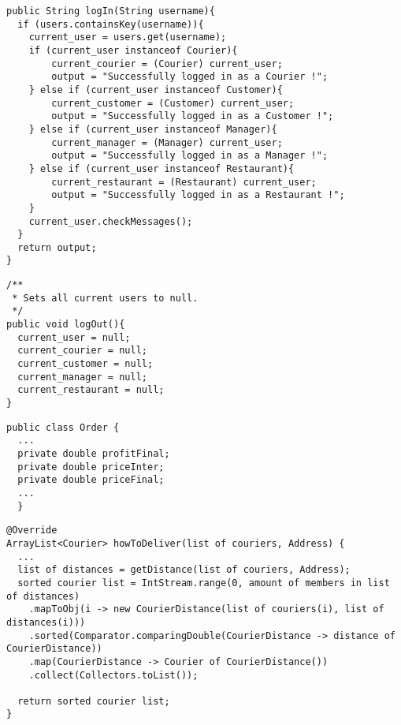 \begin{lstlisting}[caption=the main methods for the log in log out system.,
  label=lst:login]
public String logIn(String username){
  if (users.containsKey(username)){
    current_user = users.get(username);
    if (current_user instanceof Courier){
    	current_courier = (Courier) current_user;
    	output = "Successfully logged in as a Courier !";
    } else if (current_user instanceof Customer){
    	current_customer = (Customer) current_user;
    	output = "Successfully logged in as a Customer !";
    } else if (current_user instanceof Manager){
    	current_manager = (Manager) current_user;
    	output = "Successfully logged in as a Manager !";
    } else if (current_user instanceof Restaurant){
    	current_restaurant = (Restaurant) current_user;
    	output = "Successfully logged in as a Restaurant !";
    }
    current_user.checkMessages(); 
  }
  return output;
}
\end{lstlisting}

\begin{lstlisting}[caption=the main methods for the log in log out system.,
  label=lst:logout]
/** 
 * Sets all current users to null.
 */
public void logOut(){
  current_user = null;
  current_courier = null;
  current_customer = null;
  current_manager = null;
  current_restaurant = null;
}
\end{lstlisting}



\begin{lstlisting}[caption=Implementation of different price quantities in \texttt{Order}.,
  label=lst:prices_order]
public class Order {
  ...
  private double profitFinal;
  private double priceInter;
  private double priceFinal;
  ...
  }
\end{lstlisting}

 \begin{lstlisting}[caption=Pseudo java code of  fastest delivery method.,
   label=lst:fast_deliv_meth] 
@Override
ArrayList<Courier> howToDeliver(list of couriers, Address) {
  ...
  list of distances = getDistance(list of couriers, Address);	
  sorted courier list = IntStream.range(0, amount of members in list of distances)
    .mapToObj(i -> new CourierDistance(list of couriers(i), list of distances(i)))
    .sorted(Comparator.comparingDouble(CourierDistance -> distance of CourierDistance))
    .map(CourierDistance -> Courier of CourierDistance())
    .collect(Collectors.toList());
  		
  return sorted courier list;
}
  
\end{lstlisting}

